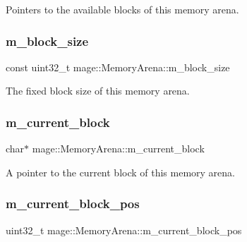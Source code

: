 Pointers to the available blocks of this memory arena. \hypertarget{classmage_1_1_memory_arena_a41e318a8b32a9027e83aec25f09b3134}{}\label{classmage_1_1_memory_arena_a41e318a8b32a9027e83aec25f09b3134} 
\subsubsection{\texorpdfstring{m\+\_\+block\+\_\+size}{m\_block\_size}}
{\footnotesize\ttfamily const uint32\+\_\+t mage\+::\+Memory\+Arena\+::m\+\_\+block\+\_\+size\hspace{0.3cm}{\ttfamily [private]}}

The fixed block size of this memory arena. \hypertarget{classmage_1_1_memory_arena_a13eba6e2a9f8d9db2df5674aa7ce0428}{}\label{classmage_1_1_memory_arena_a13eba6e2a9f8d9db2df5674aa7ce0428} 
\subsubsection{\texorpdfstring{m\+\_\+current\+\_\+block}{m\_current\_block}}
{\footnotesize\ttfamily char$\ast$ mage\+::\+Memory\+Arena\+::m\+\_\+current\+\_\+block\hspace{0.3cm}{\ttfamily [private]}}

A pointer to the current block of this memory arena. \hypertarget{classmage_1_1_memory_arena_a3874097398455749a85fe50a9e4984c0}{}\label{classmage_1_1_memory_arena_a3874097398455749a85fe50a9e4984c0} 
\subsubsection{\texorpdfstring{m\+\_\+current\+\_\+block\+\_\+pos}{m\_current\_block\_pos}}
{\footnotesize\ttfamily uint32\+\_\+t mage\+::\+Memory\+Arena\+::m\+\_\+current\+\_\+block\+\_\+pos\hspace{0.3cm}{\ttfamily [private]}}

